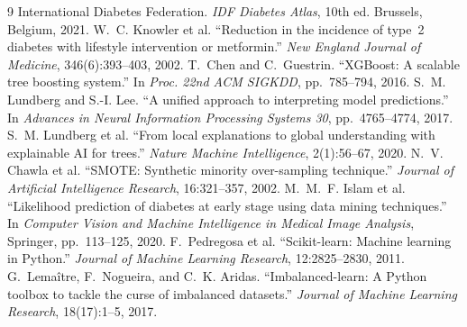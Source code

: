 \documentclass[11pt,a4paper]{article}
\begin{document}
\begin{thebibliography}{9}
\small
{} International Diabetes Federation.
  \textit{IDF Diabetes Atlas}, 10th ed. Brussels, Belgium, 2021.
 W.~C. Knowler et al. ``Reduction in the incidence of type~2
  diabetes with lifestyle intervention or metformin.''
  \textit{New England Journal of Medicine}, 346(6):393--403, 2002.
 T.~Chen and C.~Guestrin. ``XGBoost: A scalable tree boosting
  system.'' In \textit{Proc. 22nd ACM SIGKDD}, pp.~785--794, 2016.
 S.~M. Lundberg and S.-I. Lee. ``A unified approach to
  interpreting model predictions.'' In \textit{Advances in Neural Information
  Processing Systems 30}, pp.~4765--4774, 2017.
 S.~M. Lundberg et al. ``From local explanations to global
  understanding with explainable AI for trees.'' \textit{Nature Machine
  Intelligence}, 2(1):56--67, 2020.
 N.~V. Chawla et al. ``SMOTE: Synthetic minority over-sampling
  technique.'' \textit{Journal of Artificial Intelligence Research},
  16:321--357, 2002.
 M.~M.~F. Islam et al. ``Likelihood prediction of diabetes at
  early stage using data mining techniques.'' In \textit{Computer Vision and
  Machine Intelligence in Medical Image Analysis}, Springer, pp.~113--125, 2020.
 F.~Pedregosa et al. ``Scikit-learn: Machine learning in
  Python.'' \textit{Journal of Machine Learning Research}, 12:2825--2830, 2011.
 G.~Lema{\^i}tre, F.~Nogueira, and C.~K. Aridas.
  ``Imbalanced-learn: A Python toolbox to tackle the curse of imbalanced
  datasets.'' \textit{Journal of Machine Learning Research}, 18(17):1--5, 2017.
\end{thebibliography}
\end{document}
